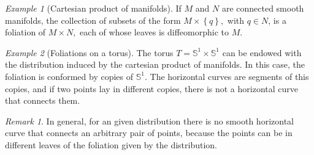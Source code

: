 \documentclass [xcolor=svgnames, t] {beamer}
\theoremstyle{definition}
\theoremstyle{plain}
\theoremstyle{remark}
\newtheorem{ex}{Example}
\newtheorem{rem}{Remark}
\begin{document}
\begin{frame}
\begin{ex}[Cartesian product of manifolds]\label{ex:product_foliation}
	If $ M $ and $ N $ are connected smooth manifolds, the collection of subsets of the form $ M\times \left\{ q \right\}, $ with $ q\in N $, is a foliation of $ M\times N, $ each of whose leaves is diffeomorphic to $ M. $  	
\end{ex}

\begin{ex}[Foliations on a torus]
	The torus $ T= \mathbb{S}^1\times \mathbb{S}^1 $ can be endowed with the distribution induced by the cartesian product of manifolds. In this case, the foliation is conformed by copies of $ \mathbb{S}^1. $ The horizontal curves are segments of this copies, and if two points lay in different copies, there is not a horizontal curve that connects them.
\end{ex}

\begin{rem}
	In general, for an given distribution there is no smooth horizontal curve that connects an arbitrary pair of points, because the points can be in different leaves of the foliation given by the distribution.
\end{rem}
\end{frame}
\end{document}
